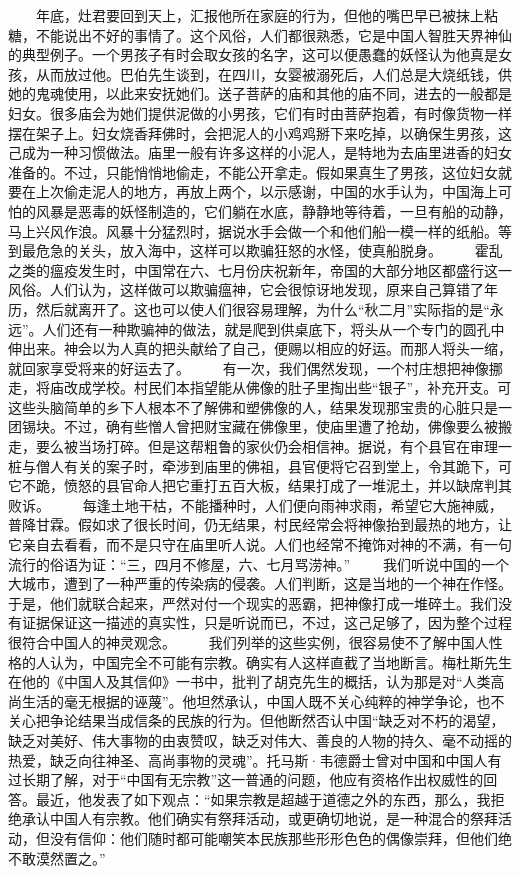 \documentclass[12pt,oneside]{book}
\begin{document}
\begin{common-format}
　　年底，灶君要回到天上，汇报他所在家庭的行为，但他的嘴巴早已被抹上粘糖，不能说出不好的事情了。这个风俗，人们都很熟悉，它是中国人智胜天界神仙的典型例子。一个男孩子有时会取女孩的名字，这可以便愚蠢的妖怪认为他真是女孩，从而放过他。巴伯先生谈到，在四川，女婴被溺死后，人们总是大烧纸钱，供她的鬼魂使用，以此来安抚她们。送子菩萨的庙和其他的庙不同，进去的一般都是妇女。很多庙会为她们提供泥做的小男孩，它们有时由菩萨抱着，有时像货物一样摆在架子上。妇女烧香拜佛时，会把泥人的小鸡鸡掰下来吃掉，以确保生男孩，这己成为一种习惯做法。庙里一般有许多这样的小泥人，是特地为去庙里进香的妇女准备的。不过，只能悄悄地偷走，不能公开拿走。假如果真生了男孩，这位妇女就要在上次偷走泥人的地方，再放上两个，以示感谢，中国的水手认为，中国海上可怕的风暴是恶毒的妖怪制造的，它们躺在水底，静静地等待着，一旦有船的动静，马上兴风作浪。风暴十分猛烈时，据说水手会做一个和他们船一模一样的纸船。等到最危急的关头，放入海中，这样可以欺骗狂怒的水怪，使真船脱身。 
　　霍乱之类的瘟疫发生时，中国常在六、七月份庆祝新年，帝国的大部分地区都盛行这一风俗。人们认为，这样做可以欺骗瘟神，它会很惊讶地发现，原来自己算错了年历，然后就离开了。这也可以使人们很容易理解，为什么“秋二月”实际指的是“永远”。人们还有一种欺骗神的做法，就是爬到供桌底下，将头从一个专门的圆孔中伸出来。神会以为人真的把头献给了自己，便赐以相应的好运。而那人将头一缩，就回家享受将来的好运去了。 
　　有一次，我们偶然发现，一个村庄想把神像挪走，将庙改成学校。村民们本指望能从佛像的肚子里掏出些“银子”，补充开支。可这些头脑简单的乡下人根本不了解佛和塑佛像的人，结果发现那宝贵的心脏只是一团锡块。不过，确有些憎人曾把财宝藏在佛像里，使庙里遭了抢劫，佛像要么被搬走，要么被当场打碎。但是这帮粗鲁的家伙仍会相信神。据说，有个县官在审理一桩与僧人有关的案子时，牵涉到庙里的佛祖，县官便将它召到堂上，令其跪下，可它不跪，愤怒的县官命人把它重打五百大板，结果打成了一堆泥土，并以缺席判其败诉。 
　　每逢土地干枯，不能播种时，人们便向雨神求雨，希望它大施神威，普降甘霖。假如求了很长时间，仍无结果，村民经常会将神像抬到最热的地方，让它亲自去看看，而不是只守在庙里听人说。人们也经常不掩饰对神的不满，有一句流行的俗语为证：“三，四月不修屋，六、七月骂涝神。” 
　　我们听说中国的一个大城市，遭到了一种严重的传染病的侵袭。人们判断，这是当地的一个神在作怪。于是，他们就联合起来，严然对付一个现实的恶霸，把神像打成一堆碎土。我们没有证据保证这一描述的真实性，只是听说而已，不过，这己足够了，因为整个过程很符合中国人的神灵观念。 
　　我们列举的这些实例，很容易使不了解中国人性格的人认为，中国完全不可能有宗教。确实有人这样直截了当地断言。梅杜斯先生在他的《中国人及其信仰》一书中，批判了胡克先生的概括，认为那是对“人类高尚生活的毫无根据的诬蔑”。他坦然承认，中国人既不关心纯粹的神学争论，也不关心把争论结果当成信条的民族的行为。但他断然否认中国“缺乏对不朽的渴望，缺乏对美好、伟大事物的由衷赞叹，缺乏对伟大、善良的人物的持久、毫不动摇的热爱，缺乏向往神圣、高尚事物的灵魂”。托马斯·韦德爵士曾对中国和中国人有过长期了解，对于“中国有无宗教”这一普通的问题，他应有资格作出权威性的回答。最近，他发表了如下观点：“如果宗教是超越于道德之外的东西，那么，我拒绝承认中国人有宗教。他们确实有祭拜活动，或更确切地说，是一种混合的祭拜活动，但没有信仰：他们随时都可能嘲笑本民族那些形形色色的偶像崇拜，但他们绝不敢漠然置之。” 

\end{common-format}
\end{document}
